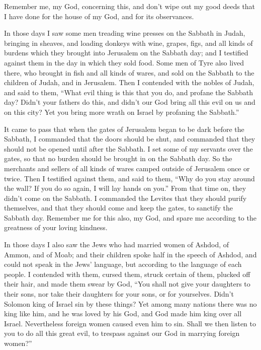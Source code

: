  Remember me, my God, concerning this, and don't wipe out
my good deeds that I have done for the house of my God, and for its
observances.

 In those days I saw some men treading wine presses on
the Sabbath in Judah, bringing in sheaves, and loading donkeys with
wine, grapes, figs, and all kinds of burdens which they brought into
Jerusalem on the Sabbath day; and I testified against them in the day in
which they sold food.  Some men of Tyre also lived there,
who brought in fish and all kinds of wares, and sold on the Sabbath to
the children of Judah, and in Jerusalem.  Then I
contended with the nobles of Judah, and said to them, ``What evil thing
is this that you do, and profane the Sabbath day?  Didn't
your fathers do this, and didn't our God bring all this evil on us and
on this city? Yet you bring more wrath on Israel by profaning the
Sabbath.''

 It came to pass that when the gates of Jerusalem began
to be dark before the Sabbath, I commanded that the doors should be
shut, and commanded that they should not be opened until after the
Sabbath. I set some of my servants over the gates, so that no burden
should be brought in on the Sabbath day.  So the
merchants and sellers of all kinds of wares camped outside of Jerusalem
once or twice.  Then I testified against them, and said
to them, ``Why do you stay around the wall? If you do so again, I will
lay hands on you.'' From that time on, they didn't come on the Sabbath.
 I commanded the Levites that they should purify
themselves, and that they should come and keep the gates, to sanctify
the Sabbath day. Remember me for this also, my God, and spare me
according to the greatness of your loving kindness.

 In those days I also saw the Jews who had married women
of Ashdod, of Ammon, and of Moab;  and their children
spoke half in the speech of Ashdod, and could not speak in the Jews'
language, but according to the language of each people. 
I contended with them, cursed them, struck certain of them, plucked off
their hair, and made them swear by God, ``You shall not give your
daughters to their sons, nor take their daughters for your sons, or for
yourselves.  Didn't Solomon king of Israel sin by these
things? Yet among many nations there was no king like him, and he was
loved by his God, and God made him king over all Israel. Nevertheless
foreign women caused even him to sin.  Shall we then
listen to you to do all this great evil, to trespass against our God in
marrying foreign women?''

